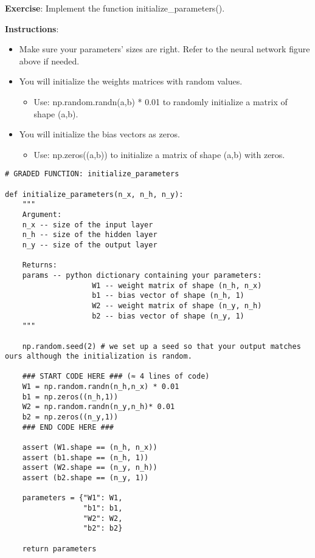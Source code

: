 \label{section4.2}

{\textbf {Exercise}}: Implement the function initialize\_parameters().

{\textbf {Instructions}}:
\begin{itemize}
\item Make sure your parameters' sizes are right. Refer to the neural network figure above if needed.
\item You will initialize the weights matrices with random values.
\begin{itemize}
\item Use: np.random.randn(a,b) * 0.01 to randomly initialize a matrix of shape (a,b).
\end{itemize}
\item You will initialize the bias vectors as zeros.
\begin{itemize}
\item Use: np.zeros((a,b)) to initialize a matrix of shape (a,b) with zeros.
\end{itemize}
\end{itemize}

\begin{verbatim}
# GRADED FUNCTION: initialize_parameters

def initialize_parameters(n_x, n_h, n_y):
    """
    Argument:
    n_x -- size of the input layer
    n_h -- size of the hidden layer
    n_y -- size of the output layer
    
    Returns:
    params -- python dictionary containing your parameters:
                    W1 -- weight matrix of shape (n_h, n_x)
                    b1 -- bias vector of shape (n_h, 1)
                    W2 -- weight matrix of shape (n_y, n_h)
                    b2 -- bias vector of shape (n_y, 1)
    """
    
    np.random.seed(2) # we set up a seed so that your output matches ours although the initialization is random.
    
    ### START CODE HERE ### (≈ 4 lines of code)
    W1 = np.random.randn(n_h,n_x) * 0.01
    b1 = np.zeros((n_h,1))
    W2 = np.random.randn(n_y,n_h)* 0.01
    b2 = np.zeros((n_y,1))
    ### END CODE HERE ###
    
    assert (W1.shape == (n_h, n_x))
    assert (b1.shape == (n_h, 1))
    assert (W2.shape == (n_y, n_h))
    assert (b2.shape == (n_y, 1))
    
    parameters = {"W1": W1,
                  "b1": b1,
                  "W2": W2,
                  "b2": b2}
    
    return parameters
\end{verbatim}



